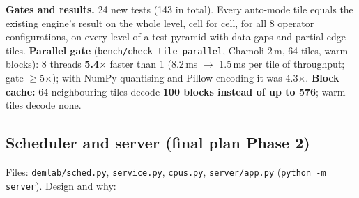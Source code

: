 ﻿\documentclass[11pt,a4paper]{article}
\newcommand{\code}[1]{\texttt{#1}}
\begin{document}
\textbf{Gates and results.} 24 new tests (143 in total). Every auto-mode tile equals the existing engine's result on the
whole level, cell for cell, for all 8 operator configurations, on every level of a test pyramid with data gaps and
partial edge tiles. \textbf{Parallel gate} (\code{bench/check\_tile\_parallel}, Chamoli 2\,m, 64 tiles, warm blocks): 8
threads \textbf{5.4$\times$} faster than 1 (8.2\,ms $\to$ 1.5\,ms per tile of throughput; gate $\geq$5$\times$); with
NumPy quantising and Pillow encoding it was 4.3$\times$. \textbf{Block cache:} 64 neighbouring tiles decode \textbf{100
blocks instead of up to 576}; warm tiles decode none.

\subsection{Scheduler and server (final plan Phase 2)}\label{sec:p5server}
Files: \code{demlab/sched.py}, \code{service.py}, \code{cpus.py}, \code{server/app.py} (\code{python -m server}). Design
and why:
\end{document}
